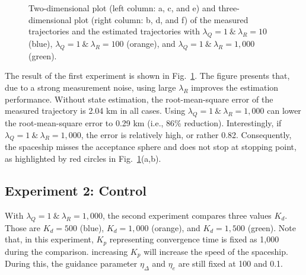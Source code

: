 \begin{figure}[h]
 	\caption{Two-dimensional plot (left column: a, c, and e) and three-dimensional plot (right column: b, d, and f) of the measured trajectories and the estimated trajectories with $\lambda_Q=1\:\&\:\lambda_R=10$ (blue), $\lambda_Q=1\:\&\:\lambda_R=100$ (orange), and $\lambda_Q=1\:\&\:\lambda_R=1,000$ (green).}
 	
 	\label{fig:exp_QR}
 \end{figure}
  
 The result of the first experiment is shown in Fig.~\ref{fig:exp_QR}. The figure presents that, due to a strong measurement noise, using large $\lambda_R$ improves the estimation performance. Without state estimation, the root-mean-square error of the measured trajectory is 2.04 km in all cases. Using $\lambda_Q=1\:\&\:\lambda_R=1,000$ can lower the root-mean-square error to 0.29 km (i.e., 86\% reduction). Interestingly, if $\lambda_Q=1\:\&\:\lambda_R=1,000$, the error is relatively high, or rather 0.82. Consequently, the spaceship misses the acceptance sphere and does not stop at stopping point, as highlighted by red circles in Fig.~\ref{fig:exp_QR}(a,b). 
 

\subsection{Experiment 2: Control}
\label{sec:exp_control}

With $\lambda_Q=1\:\&\:\lambda_R=1,000$, the second experiment compares three values $K_d$. Those are $K_d=500$ (blue), $K_d=1,000$ (orange), and $K_d=1,500$ (green). Note that, in this experiment, $K_p$ representing convergence time is fixed as 1,000 during the comparison. increasing $K_p$ will increase the speed of the spaceship.  During this, the guidance parameter $\eta_\Delta$ and $\eta_e$ are still fixed at 100 and 0.1.

